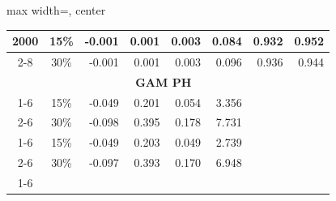 \documentclass[11pt]{article}
\begin{document}
\begin{table}[h]
\begin{adjustbox}{max width=\textwidth, center}
\begin{tabular}{cc|rrrrll}
\multicolumn{1}{|c|}{\multirow{2}{*}{2000}} & 15\%                  & \multicolumn{1}{r|}{-0.001}                  & \multicolumn{1}{r|}{0.001}                   & \multicolumn{1}{r|}{0.003}                   & \multicolumn{1}{r|}{0.084}                     & \multicolumn{1}{r|}{0.932}                   & \multicolumn{1}{r|}{0.952}                   \\ \cline{2-8} 
\multicolumn{1}{|c|}{}                      & 30\%                  & \multicolumn{1}{r|}{-0.001}                  & \multicolumn{1}{r|}{0.001}                   & \multicolumn{1}{r|}{0.003}                   & \multicolumn{1}{r|}{0.096}                     & \multicolumn{1}{r|}{0.936}                   & \multicolumn{1}{r|}{0.944}                   \\ \hline
\multicolumn{1}{l}{}                        & \multicolumn{1}{l|}{} & \multicolumn{4}{c|}{\textbf{GAM PH}}                                                                                                                                                        &                                              &                                              \\ \cline{1-6}
\multicolumn{1}{|c|}{\multirow{2}{*}{500}}  & 15\%                  & \multicolumn{1}{r|}{-0.049}                  & \multicolumn{1}{r|}{0.201}                   & \multicolumn{1}{r|}{0.054}                   & \multicolumn{1}{r|}{3.356}                     &                                              &                                              \\ \cline{2-6}
\multicolumn{1}{|c|}{}                      & 30\%                  & \multicolumn{1}{r|}{-0.098}                  & \multicolumn{1}{r|}{0.395}                   & \multicolumn{1}{r|}{0.178}                   & \multicolumn{1}{r|}{7.731}                     &                                              &                                              \\ \cline{1-6}
\multicolumn{1}{|c|}{\multirow{2}{*}{1000}} & 15\%                  & \multicolumn{1}{r|}{-0.049}                  & \multicolumn{1}{r|}{0.203}                   & \multicolumn{1}{r|}{0.049}                   & \multicolumn{1}{r|}{2.739}                     &                                              &                                              \\ \cline{2-6}
\multicolumn{1}{|c|}{}                      & 30\%                  & \multicolumn{1}{r|}{-0.097}                  & \multicolumn{1}{r|}{0.393}                   & \multicolumn{1}{r|}{0.170}                   & \multicolumn{1}{r|}{6.948}                     &                                              &                                              \\ \cline{1-6}

\end{tabular}
\end{adjustbox}
\end{table}
\end{document}
